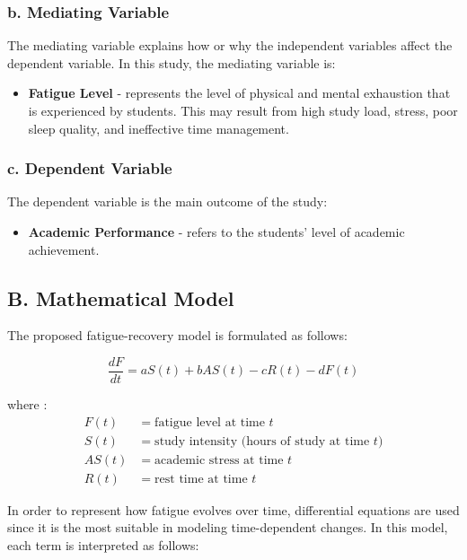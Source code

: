 \documentclass [12pt]{article}
\begin{document}
\subsubsection*{b. Mediating Variable}

The mediating variable explains how or why the independent variables affect the dependent variable. In this study, the mediating variable is: 

\begin{itemize}
    \item \textbf{Fatigue Level} - represents the level of physical and mental exhaustion that is experienced by students. This may result from high study load, stress, poor sleep quality, and ineffective time management. 
\end{itemize}

\subsubsection*{c. Dependent Variable}

The dependent variable is the main outcome of the study:

\begin{itemize}
    \item \textbf{Academic Performance} - refers to the students’ level of academic achievement. 
\end{itemize}


\subsection*{B. Mathematical Model}

The proposed fatigue-recovery model is formulated as follows:

\begin{equation*}
\frac{dF}{dt} = a S(t) + b AS(t) - c R(t) - d F(t)
\end{equation*}

where : 
\begin{align*}
F(t)  &= \text{fatigue level at time } t \\
S(t)  &= \text{study intensity (hours of study at time } t\text{)} \\
AS(t) &= \text{academic stress at time } t \\
R(t)  &= \text{rest time at time } t
\end{align*}

In order to represent how fatigue evolves over time, differential equations are used since it is the most suitable in modeling time-dependent changes.  In this model, each term is interpreted as follows: 
\end{document}
